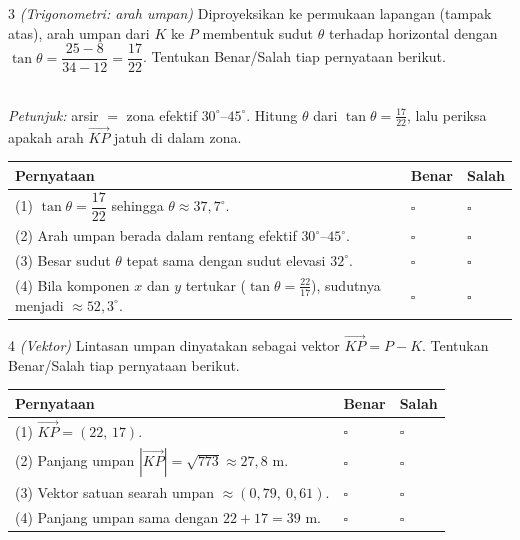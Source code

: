 \documentclass[11pt]{article}
\makeatletter
\newenvironment{bstabel}{%
  \par\smallskip\begin{center}\renewcommand{\arraystretch}{1.35}%
  \begin{tabular}{@{}p{0.72\textwidth}>{\centering\arraybackslash}m{1.5cm}>{\centering\arraybackslash}m{1.5cm}@{}}
  \toprule
  \textbf{Pernyataan} & \textbf{Benar} & \textbf{Salah}\\\midrule}%
  {\bottomrule\end{tabular}\end{center}}
\newcommand{\bs}[1]{#1 & $\square$ & $\square$\\[1pt]}
\makeatother
\begin{document}
\begin{soal}{3 \normalfont\itshape(Trigonometri: arah umpan)}
Diproyeksikan ke permukaan lapangan (tampak atas), arah umpan dari $K$ ke $P$
membentuk sudut $\theta$ terhadap horizontal dengan
$\tan\theta=\dfrac{25-8}{34-12}=\dfrac{17}{22}$. Tentukan Benar/Salah tiap
pernyataan berikut.

\begin{center}
\\[2pt]
{\small\textit{Petunjuk:} arsir $=$ zona efektif $30^\circ$--$45^\circ$. Hitung $\theta$ dari $\tan\theta=\tfrac{17}{22}$, lalu periksa apakah arah $\vec{KP}$ jatuh di dalam zona.}
\end{center}

\begin{bstabel}
  \bs{(1) $\tan\theta=\dfrac{17}{22}$ sehingga $\theta\approx 37{,}7^\circ$.}
  \bs{(2) Arah umpan berada dalam rentang efektif $30^\circ$--$45^\circ$.}
  \bs{(3) Besar sudut $\theta$ tepat sama dengan sudut elevasi $32^\circ$.}
  \bs{(4) Bila komponen $x$ dan $y$ tertukar ($\tan\theta=\tfrac{22}{17}$), sudutnya menjadi $\approx 52{,}3^\circ$.}
\end{bstabel}
\end{soal}

\begin{soal}{4 \normalfont\itshape(Vektor)}
Lintasan umpan dinyatakan sebagai vektor $\vec{KP}=P-K$. Tentukan Benar/Salah
tiap pernyataan berikut.
\begin{bstabel}
  \bs{(1) $\vec{KP}=(22,\,17)$.}
  \bs{(2) Panjang umpan $|\vec{KP}|=\sqrt{773}\approx 27{,}8$ m.}
  \bs{(3) Vektor satuan searah umpan $\approx (0{,}79,\ 0{,}61)$.}
  \bs{(4) Panjang umpan sama dengan $22+17=39$ m.}
\end{bstabel}
\end{soal}
\end{document}
